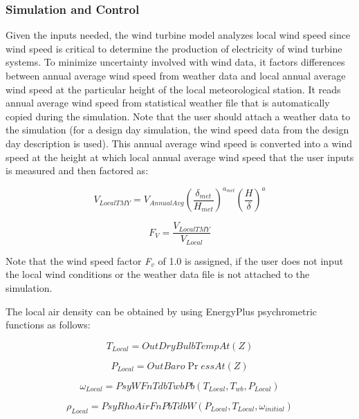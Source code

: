 \subsubsection{Simulation and Control}\label{simulation-and-control-003}

Given the inputs needed, the wind turbine model analyzes local wind speed since wind speed is critical to determine the production of electricity of wind turbine systems. To minimize uncertainty involved with wind data, it factors differences between annual average wind speed from weather data and local annual average wind speed at the particular height of the local meteorological station. It reads annual average wind speed from statistical weather file that is automatically copied during the simulation. Note that the user should attach a weather data to the simulation (for a design day simulation, the wind speed data from the design day description is used). This annual average wind speed is converted into a wind speed at the height at which local annual average wind speed that the user inputs is measured and then factored as:

\begin{equation}
{V_{LocalTMY}} = {V_{AnnualAvg}}{\left( {\frac{{{\delta_{met}}}}{{{H_{met}}}}} \right)^{{a_{met}}}}{\left( {\frac{H}{\delta }} \right)^a}
\end{equation}

\begin{equation}
{F_V} = \frac{{{V_{LocalTMY}}}}{{{V_{Local}}}}
\end{equation}

Note that the wind speed factor \emph{F\(_{v}\)} of 1.0 is assigned, if the user does not input the local wind conditions or the weather data file is not attached to the simulation.

The local air density can be obtained by using EnergyPlus psychrometric functions as follows:

\begin{equation}
{T_{Local}} = OutDryBulbTempAt(Z)
\end{equation}

\begin{equation}
{P_{Local}} = OutBaro\Pr essAt(Z)
\end{equation}

\begin{equation}
{\omega_{Local}} = PsyWFnTdbTwbPb({T_{Local}},{T_{wb}},{P_{Local}})
\end{equation}

\begin{equation}
{\rho_{Local}} = PsyRhoAirFnPbTdbW({P_{Local}},{T_{Local}},{\omega_{initial}})
\end{equation}

